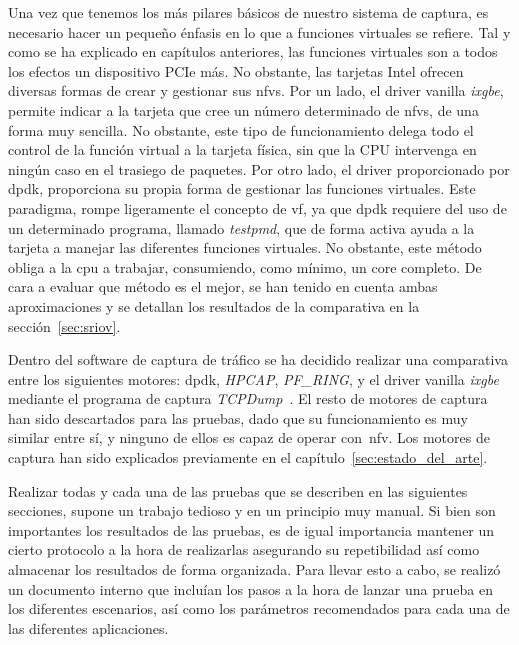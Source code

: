 Una vez que tenemos los más pilares básicos de nuestro sistema de captura, es necesario hacer un pequeño énfasis en lo que a funciones virtuales se refiere. Tal y como se ha explicado en capítulos anteriores, las funciones virtuales son a todos los efectos un dispositivo PCIe más. No obstante, las tarjetas Intel ofrecen diversas formas de crear y gestionar sus \glspl{nfv}. Por un lado, el driver \gls{vanilla} \textit{ixgbe}, permite indicar a la tarjeta que cree un número determinado de \glspl{nfv}, de una forma muy sencilla. No obstante, este tipo de funcionamiento delega todo el control de la función virtual a la tarjeta física, sin que la CPU intervenga en ningún caso en el trasiego de paquetes.
%
Por otro lado, el driver proporcionado por \gls{dpdk}, proporciona su propia forma de gestionar las funciones virtuales. Este paradigma, rompe ligeramente el concepto de \gls{vf}, ya que \gls{dpdk} requiere del uso de un determinado programa, llamado \textit{testpmd}, que de forma activa ayuda a la tarjeta a manejar las diferentes funciones virtuales. No obstante, este método obliga a la \gls{cpu} a trabajar, consumiendo, como mínimo, un \gls{core} completo. De cara a evaluar que método es el mejor, se han tenido en cuenta ambas aproximaciones y se detallan los resultados de la comparativa en la sección~\ref{sec:sriov}.

Dentro del software de captura de tráfico se ha decidido realizar una comparativa entre los siguientes motores: \gls{dpdk}, \textit{HPCAP}, \textit{PF\_RING}, y el driver \gls{vanilla} \textit{ixgbe} mediante el programa de captura \textit{TCPDump}~\cite{bib:tcpdump}. El resto de motores de captura han sido descartados para las pruebas, dado que su funcionamiento es muy similar entre sí, y ninguno de ellos es capaz de operar con~\gls{nfv}. Los motores de captura han sido explicados previamente en el capítulo~\ref{sec:estado_del_arte}.


Realizar todas y cada una de las pruebas que se describen en las siguientes secciones, supone un trabajo tedioso y en un principio muy manual. Si bien son importantes los resultados de las pruebas, es de igual importancia mantener un cierto protocolo a la hora de realizarlas asegurando su repetibilidad así como almacenar los resultados de forma organizada. 
Para llevar esto a cabo, se realizó un documento interno que incluían los pasos a la hora de lanzar una prueba en los diferentes escenarios, así como los parámetros recomendados para cada una de las diferentes aplicaciones.

